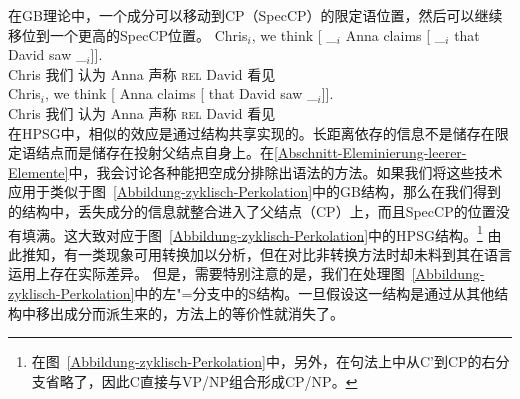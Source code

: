 在GB理论中，一个成分可以移动到CP（SpecCP）的限定语位置，然后可以继续移位到一个更高的SpecCP位置。
\eal\settowidth{}
\ex
\gll Chris$_i$, we think [ \_$_i$ Anna claims [ \_$_i$ that David saw \_$_i$]].\\
    Chris 我们 认为 {} {} Anna 声称 {} {} \textsc{rel} David 看见\\
\ex
\gll Chris$_i$, we think [ Anna claims [ that David saw \_$_i$]].\\
    Chris 我们 认为 {} Anna 声称 {} \textsc{rel} David 看见\\
\zl
在HPSG中，相似的效应是通过结构共享实现的。长距离依存的信息不是储存在限定语结点而是储存在投射父结点自身上。在\ref{Abschnitt-Eleminierung-leerer-Elemente}中，我会讨论各种能把空成分排除出语法的方法。如果我们将这些技术应用于类似于图~\ref{Abbildung-zyklisch-Perkolation}中的GB结构，那么在我们得到的结构中，丢失成分的信息就整合进入了父结点（CP）上，而且SpecCP的位置没有填满。这大致对应于图~\ref{Abbildung-zyklisch-Perkolation}中的HPSG结构。\footnote{%
在图~\ref{Abbildung-zyklisch-Perkolation}中，另外，在句法上中从C’到CP的右分支省略了，因此C直接与VP/NP组合形成CP/NP。%
}
由此推知，有一类现象可用转换加以分析，但在对比非转换方法时却未料到其在语言运用上存在实际差异。
但是，需要特别注意的是，我们在处理图~\ref{Abbildung-zyklisch-Perkolation}中的左"=分支中的S结构。一旦假设这一结构是通过从其他结构中移出成分而派生来的，方法上的等价性就消失了。

